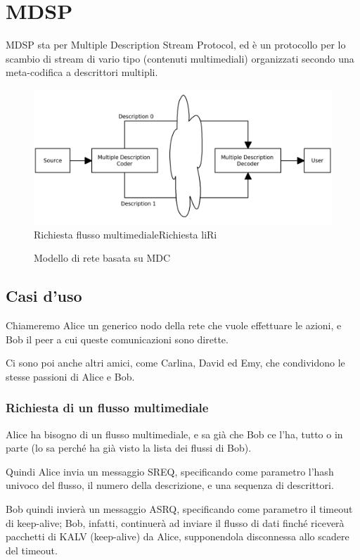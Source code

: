 \section{MDSP}


MDSP sta per Multiple Description Stream Protocol, ed è un protocollo per lo
scambio di stream di vario tipo (contenuti multimediali) organizzati secondo una
meta-codifica a descrittori multipli.

\begin{figure}[b]
\includegraphics[width=15cm]{../images/network_mdc.png}Richiesta flusso
multimedialeRichiesta liRi
\label{fig:network_mdc}
\caption{Modello di rete basata su MDC}
\end{figure}

\subsection{Casi d'uso}


Chiameremo Alice un generico nodo della rete che vuole effettuare le azioni, e
Bob il peer a cui queste comunicazioni sono dirette.

Ci sono poi anche altri amici, come Carlina, David ed Emy, che condividono le
stesse passioni di Alice e Bob.


\subsubsection{Richiesta di un flusso multimediale}
%

Alice ha bisogno di un flusso multimediale, e sa già che Bob ce l'ha, tutto o in
parte (lo sa perché ha già visto la lista dei flussi di Bob).

Quindi Alice invia un messaggio SREQ, specificando come parametro l'hash univoco
del flusso, il numero della descrizione, e una sequenza di descrittori.

Bob quindi invierà un messaggio ASRQ, specificando come parametro il timeout di
keep-alive; Bob, infatti, continuerà ad inviare il flusso di dati finché riceverà
pacchetti di KALV (keep-alive) da Alice, supponendola disconnessa allo scadere
del timeout.






